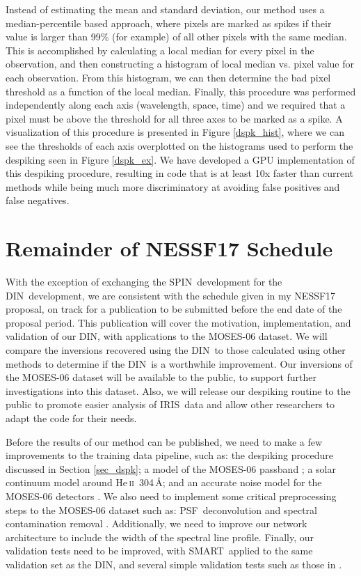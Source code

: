 \documentclass[10pt,letterpaper, doublespace]{article}
\newcommand{\HeII}{He\,\textsc{ii}~304\,\AA}
\newcommand{\MOSES}{\ac{MOSES}}
\newcommand{\SMART}{\ac{SMART}}
\newcommand{\DIN}{\ac{DIN}}
\newcommand{\SPIN}{\ac{SPIN}}
\newcommand{\IRIS}{\ac{IRIS}}
\newcommand{\PSF}{\ac{PSF}}
\begin{document}
			Instead of estimating the mean and standard deviation, our method uses a median-percentile based approach, where pixels are marked as spikes if their value is larger than 99\% (for example) of all other pixels with the same median. 
			This is accomplished by calculating a local median for every pixel in the observation, and then constructing a histogram of local median vs. pixel value for each observation.
			From this histogram, we can then determine the bad pixel threshold as a function of the local median.
			Finally, this procedure was performed independently along each axis (wavelength, space, time) and we required that a pixel must be above the threshold for all three axes to be marked as a spike.
			A visualization of this procedure is presented in Figure \ref{dspk_hist}, where we can see the thresholds of each axis overplotted on the histograms used to perform the despiking seen in Figure \ref{dspk_ex}.		
			We have developed a GPU implementation of this despiking procedure, resulting in code that is at least 10x faster than current methods while being much more discriminatory at avoiding false positives and false negatives.

		
	\section{Remainder of NESSF17 Schedule}
	
		With the exception of exchanging the \SPIN\ development for the \DIN\ development, we are consistent with the schedule given in my NESSF17 proposal, on track for a publication to be submitted before the end date of the proposal period.
		This publication will cover the motivation, implementation, and validation of our \DIN, with applications to the \MOSES-06 dataset.
		We will compare the inversions recovered using the \DIN\ to those calculated using other methods to determine if the \DIN\ is a worthwhile improvement.
		Our inversions of the \MOSES-06 dataset will be available to the public, to support further investigations into this dataset.
		Also, we will release our despiking routine to the public to promote easier analysis of \IRIS\ data and allow other researchers to adapt the code for their needs.
		
		Before the results of our method can be published, we need to make a few improvements to the training data pipeline, such as: the despiking procedure discussed in Section \ref{sec_dspk}; a model of the \MOSES-06 passband \citep{Fox2011}; a solar continuum model around \HeII \citep{Fox2011}; and an accurate noise model for the \MOSES-06 detectors \cite{Rust2017}.
		We also need to implement some critical preprocessing steps to the \MOSES-06 dataset such as: \PSF\ deconvolution \citep{Rust2017} and spectral contamination removal \citep{Parker2016}.
		Additionally, we need to improve our network architecture to include the width of the spectral line profile.
		Finally, our validation tests need to be improved, with \SMART\ applied to the same validation set as the \DIN, and several simple validation tests such as those in \cite{Rust2017}.
	
\end{document}
